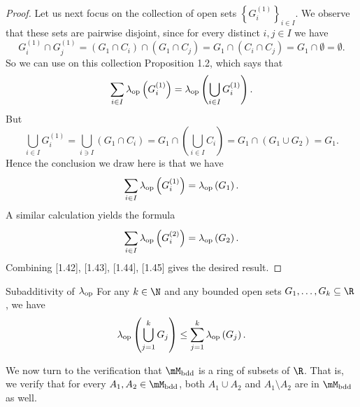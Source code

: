 \documentclass[pmath450]{subfiles}
\begin{document}
\begin{proof}
        Let us next focus on the collection of open sets $\left\lbrace G_i^{\left( 1 \right)} \right\rbrace^{}_{i\in I}$. We observe that these sets are pairwise disjoint, since for every distinct $i,j\in I$ we have
        \begin{equation*}
            G_i^{\left( 1 \right)}\cap G_j^{\left( 1 \right)} = \left( G_1\cap C_i \right)\cap \left( G_1\cap C_j \right) = G_1\cap \left( C_i\cap C_j \right) = G_1\cap\emptyset = \emptyset.
        \end{equation*}
        So we can use on this collection Proposition 1.2, which says that
        \begin{equation*}
            \sum^{}_{i\in I}\lambda_{\operatorname{op}}\left( G_i^{\left( 1 \right)} \right)=\lambda_{\operatorname{op}}\left( \bigcup^{}_{i\in I}G_i^{\left( 1 \right)} \right).
        \end{equation*}
        But
        \begin{equation*}
            \bigcup^{}_{i\in I}G_i^{\left( 1 \right)} = \bigcup^{}_{i\ni I}\left( G_1\cap C_i \right)=G_1\cap\left( \bigcup^{}_{i\in I}C_i \right)=G_1\cap\left( G_1\cup G_2 \right)=G_1.
        \end{equation*}
        Hence the conclusion we draw here is that we have
        \begin{equation}
            \sum^{}_{i\in I}\lambda_{\operatorname{op}}\left( G_i^{\left( 1 \right)} \right) = \lambda_{\operatorname{op}}\left( G_1 \right).
        \end{equation}
        A similar calculation yields the formula
        \begin{equation}
            \sum^{}_{i\in I}\lambda_{\operatorname{op}}\left( G_i^{\left( 2 \right)} \right) = \lambda_{\operatorname{op}}\left( G_2 \right).
        \end{equation}
        Combining [1.42], [1.43], [1.44], [1.45] gives the desired result.
    \end{proof}

    \begin{cor}{Subadditivity of $\lambda_{\operatorname{op}}$}
        For any $k\in\N$ and any bounded open sets $G_1,\ldots,G_k\subseteq\R$, we have
        \begin{equation*}
            \lambda_{\operatorname{op}}\left( \bigcup^{k}_{j=1}G_j \right) \leq \sum^{k}_{j=1}\lambda_{\operatorname{op}}\left( G_j \right).
        \end{equation*}
    \end{cor}	


    \np We now turn to the verification that $\mM_{\bdd}$ is a ring of subsets of $\R$. That is, we verify that for every $A_1,A_2\in\mM_{\bdd}$, both $A_1\cup A_2$ and $A_1\setminus A_2$ are in $\mM_{\bdd}$ as well. 
\end{document}
